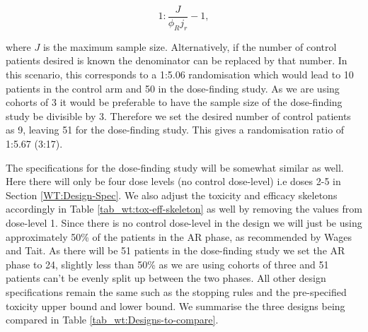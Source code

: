 \begin{equation}
	1 : \frac{J}{\phi_R j_r} - 1,
\end{equation}

where $J$ is the maximum sample size. Alternatively, if the number of control patients desired is known the denominator can be replaced by that number. In this scenario, this corresponds to a 1:5.06 randomisation which would lead to 10 patients in the control arm and 50 in the dose-finding study. As we are using cohorts of 3 it would be preferable to have the sample size of the dose-finding study be divisible by 3. Therefore we set the desired number of control patients as 9, leaving 51 for the dose-finding study. This gives a randomisation ratio of 1:5.67 (3:17). 

The specifications for the dose-finding study will be somewhat similar as well. Here there will only be four dose levels (no control dose-level) i.e doses 2-5 in Section \ref{WT:Design-Spec}. We also adjust the toxicity and efficacy skeletons accordingly in Table \ref{tab_wt:tox-eff-skeleton} as well by removing the values from dose-level 1. Since there is no control dose-level in the design we will just be using approximately 50\% of the patients in the AR phase, as recommended by Wages and Tait. As there will be 51 patients in the dose-finding study we set the AR phase to 24, slightly less than 50\% as we are using cohorts of three and 51 patients can't be evenly split up between the two phases. All other design specifications remain the same such as the stopping rules and the pre-specified toxicity upper bound and lower bound. We summarise the three designs being compared in Table \ref{tab_wt:Designs-to-compare}.

